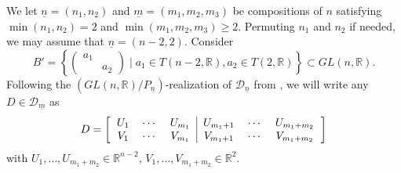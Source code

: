 \documentclass[pdftex]{sigma}
\numberwithin{equation}{section}
\newtheorem{Proposition}[Theorem]{Proposition}
\theoremstyle{definition}
\newcommand{\R}{\mathbb{R}}
\newcommand{\D}{\mathcal{D}}
\newcommand{\T}{T}
\theoremstyle{plain}
\theoremstyle{plain}
\theoremstyle{plain}
\theoremstyle{plain}
\begin{document}
We let $\underline n = (n_1,n_2)$ and $\underline m = (m_1,m_2,m_3)$ be compositions of $n$ satisfying $\min(n_1,n_2) = 2$ and $\min(m_1,m_2,m_3) \geqslant 2$. Permuting $n_1$ and $n_2$ if needed, we may assume that $\underline n = (n-2,2)$. Consider
\begin{equation*}
	B' = \left\{\begin{pmatrix}
	a_1 & \\
	& a_2
\end{pmatrix} \mid a_1 \in \T(n-2,\R), a_2 \in \T(2,\R)\right\} \subset GL(n,\R).
\end{equation*}
Following the $(GL(n,\R)/P_{\underline n})$-realization of $\D_{\underline n}$ from , we will write any $D \in \D_{\underline m}$ as
\begin{equation*}
	D = \left[\begin{tabular}{ccc|ccc}
	$U_1$ & $\cdots$ & $U_{m_1}$ & $U_{m_1+1}$ & $\cdots$ & $U_{m_1+m_2}$ \\
	$V_1$ & $\cdots$ & $V_{m_1}$ & $V_{m_1+1}$ & $\cdots$ & $V_{m_1+m_2}$
\end{tabular}\right]
\end{equation*}
with $U_1,\dots, U_{m_1+m_2} \in \R^{n-2}$, $V_1,\dots,V_{m_1+m_2} \in \R^{2}$.

\end{document}
